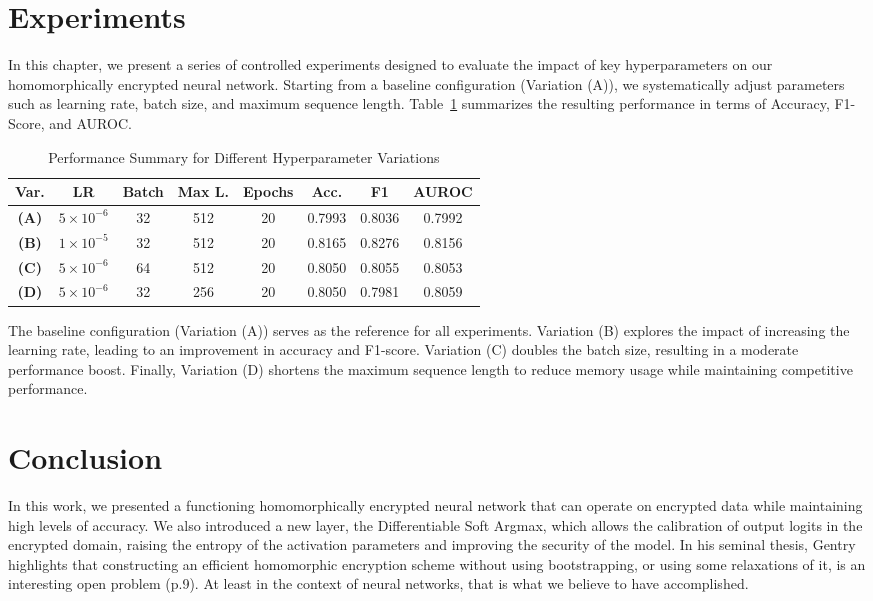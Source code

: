 \documentclass{article}
\begin{document}
\section{Experiments}

In this chapter, we present a series of controlled experiments designed to evaluate the impact of key hyperparameters on our homomorphically encrypted neural network. Starting from a baseline configuration (Variation (A)), we systematically adjust parameters such as learning rate, batch size, and maximum sequence length. Table~\ref{tab:experiment_results} summarizes the resulting performance in terms of Accuracy, F1-Score, and AUROC.

\begin{table}[h]
    \centering
    \label{tab:experiment_results}
    \begin{tabular}{|c|c|c|c|c|c|c|c|}
        \hline
        \textbf{Var.} & \textbf{LR} & \textbf{Batch} & \textbf{Max L.} & \textbf{Epochs} & \textbf{Acc.} & \textbf{F1} & \textbf{AUROC} \\
        \hline
        \textbf{(A)} & $5\times10^{-6}$ & 32 & 512 & 20 & 0.7993 & 0.8036 & 0.7992 \\
        \textbf{(B)} & $1\times10^{-5}$ & 32 & 512 & 20 & 0.8165 & 0.8276 & 0.8156 \\
        \textbf{(C)} & $5\times10^{-6}$ & 64 & 512 & 20 & 0.8050 & 0.8055 & 0.8053 \\
        \textbf{(D)} & $5\times10^{-6}$ & 32 & 256 & 20 & 0.8050 & 0.7981 & 0.8059 \\
        \hline
      \end{tabular}
     \caption{Performance Summary for Different Hyperparameter Variations}
\end{table}


The baseline configuration (Variation (A)) serves as the reference for all experiments. Variation (B) explores the impact of increasing the learning rate, leading to an improvement in accuracy and F1-score. Variation (C) doubles the batch size, resulting in a moderate performance boost. Finally, Variation (D) shortens the maximum sequence length to reduce memory usage while maintaining competitive performance.


\section{Conclusion}
In this work, we presented a functioning homomorphically encrypted neural network that can operate on encrypted data while maintaining high levels of accuracy. We also introduced a new layer, the Differentiable Soft Argmax, which allows the calibration of output logits in the encrypted domain, raising the entropy of the activation parameters and improving the security of the model. In his seminal thesis, Gentry highlights that constructing an efficient homomorphic encryption scheme without using bootstrapping, or using some relaxations of it, is an interesting open problem (p.9). At least in the context of neural networks, that is what we believe to have accomplished.
\end{document}
